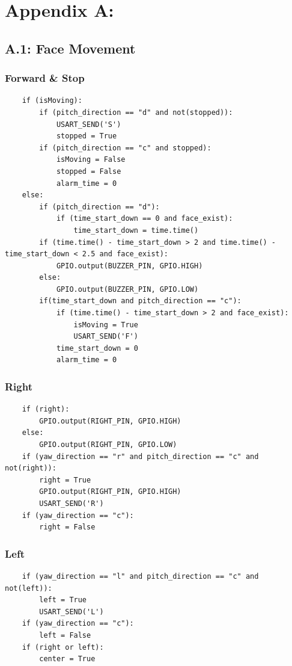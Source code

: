 \noindent
\appendix


\chapter*{Appendix A: }
\section*{A.1: Face Movement}
\subsection{Forward \& Stop}
\begin{verbatim}
    if (isMoving):
        if (pitch_direction == "d" and not(stopped)):
            USART_SEND('S')
            stopped = True
        if (pitch_direction == "c" and stopped):
            isMoving = False
            stopped = False
            alarm_time = 0
    else:
        if (pitch_direction == "d"):
            if (time_start_down == 0 and face_exist):
                time_start_down = time.time()
        if (time.time() - time_start_down > 2 and time.time() - time_start_down < 2.5 and face_exist):
            GPIO.output(BUZZER_PIN, GPIO.HIGH)
        else:
            GPIO.output(BUZZER_PIN, GPIO.LOW)  
        if(time_start_down and pitch_direction == "c"):
            if (time.time() - time_start_down > 2 and face_exist):
                isMoving = True
                USART_SEND('F')
            time_start_down = 0
            alarm_time = 0
\end{verbatim}

\subsection{Right}
\begin{verbatim}
    if (right):
        GPIO.output(RIGHT_PIN, GPIO.HIGH)
    else:
        GPIO.output(RIGHT_PIN, GPIO.LOW)
    if (yaw_direction == "r" and pitch_direction == "c" and not(right)):
        right = True
        GPIO.output(RIGHT_PIN, GPIO.HIGH)
        USART_SEND('R')
    if (yaw_direction == "c"):
        right = False
\end{verbatim}

\subsection{Left}
\begin{verbatim}
    if (yaw_direction == "l" and pitch_direction == "c" and not(left)):
        left = True
        USART_SEND('L')
    if (yaw_direction == "c"):
        left = False
    if (right or left):
        center = True
\end{verbatim}

